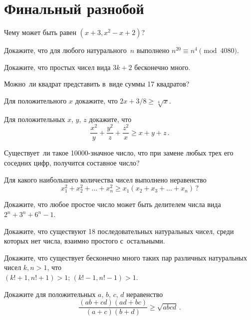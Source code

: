 
\section*{Финальный разнобой}


\begin{problems}

\item
Чему может быть равен $(x + 3, x^2 - x + 2)$?

\item
Докажите, что для любого натурального~$n$ выполнено
$n^{20} \equiv n^{4} \pmod{4080}$.

\item
Докажите, что простых чисел вида $3 k + 2$ бесконечно много.

\item
Можно~ли квадрат представить в~виде суммы 17 квадратов?

\item
Для положительного $x$ докажите, что $2 x + 3 / 8 \geq \sqrt[4]{x}$.

\item
Для положительных $x$, $y$, $z$ докажите, что
\[
    \frac{x^2}{y} + \frac{y^2}{z} + \frac{z^2}{x} \geq x + y + z
\, . \]

\item
Существует~ли такое 10000-значное число, что при замене любых трех его соседних
цифр, получится составное число?

\item
Для какого наибольшего количества чисел выполнено неравенство
\[
    x_{1}^2 + x_{2}^2 + \ldots + x_{n}^2
\geq
    x_{1} (x_{2} + x_{3} + \ldots + x_{n})
\, ? \]

\item
Докажите, что любое простое число может быть делителем числа вида
$2^n + 3^n + 6^n - 1$.

\item
Докажите, что существуют 18 последовательных натуральных чисел, среди которых
нет числа, взаимно простого с~остальными.

\item
Докажите, что существует бесконечно много таких пар различных натуральных чисел
$k, n > 1$, что
\\
\subproblem $(k! + 1, n! + 1) > 1$;
\qquad
\subproblem $(k! - 1, n! - 1) > 1$.

\item
Докажите для положительных $a$, $b$, $c$, $d$ неравенство
\[
    \frac{(a b + c d) (a d + b c)}{(a + c) (b + d)}
\geq
    \sqrt{abcd}
\, . \]

\end{problems}

